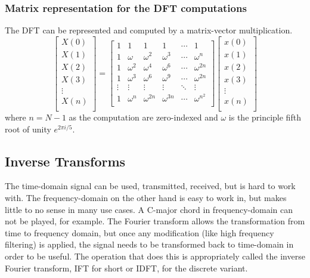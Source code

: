 \subsubsection{Matrix representation for the DFT computations} 
The DFT can be represented and computed by a matrix-vector multiplication. 
$$
\begin{bmatrix}
    X(0) \\
    X(1) \\
    X(2) \\
    X(3) \\
    \vdots\\
    X(n) \\
\end{bmatrix}
=
\begin{bmatrix}
    1 & 1 & 1 & 1 & \cdots & 1\\
    1 & \omega & \omega ^2 & \omega ^3 & \cdots & \omega ^n\\
    1 & \omega ^2 & \omega ^4 & \omega ^6 & \cdots & \omega ^{2n}\\
    1 & \omega ^3 & \omega ^6 & \omega ^9 & \cdots & \omega ^{2n}\\
    \vdots & \vdots & \vdots & \vdots & \ddots & \vdots \\
    1 & \omega ^{n} & \omega ^{2n} & \omega ^{3n} & \cdots & \omega ^{{n^2}}\\
\end{bmatrix}
\begin{bmatrix}
    x(0) \\
    x(1) \\
    x(2) \\
    x(3) \\
    \vdots\\
    x(n) \\
\end{bmatrix}
$$
where $n = N-1$ as the computation are zero-indexed and $\omega$ is the principle fifth root of unity $e^{2\pi i/5} $. 

\subsection{Inverse Transforms}
The time-domain signal can be used, transmitted, received, but is hard to work with. The frequency-domain on the other hand is easy to work in, but makes little to no sense in many use cases. A C-major chord in frequency-domain can not be played, for example. The Fourier transform allows the transformation from time to frequency domain, but once any modification (like high frequency filtering) is applied, the signal needs to be transformed back to time-domain in order to be useful. The operation that does this is appropriately called the inverse Fourier transform, IFT for short or IDFT, for the discrete variant.

